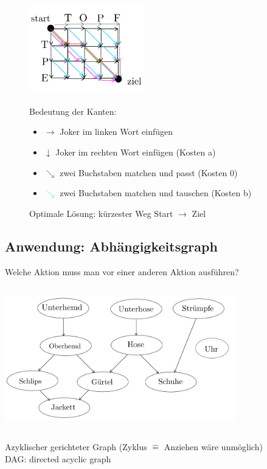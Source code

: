\documentclass[11pt, fleqn]{scrreprt}
\begin{document}
    \begin{figure}[htbp]
        \begin{minipage}{5cm}
            \vspace*{0mm}
            \includegraphics[width=5cm,height=4cm,keepaspectratio]{./Pictures/Dijkstragitter.png}
        \end{minipage}
        \begin{minipage}{10cm}
            \vspace*{0mm}
            Bedeutung der Kanten:
            \begin{itemize}
                \item $\rightarrow$ Joker im linken Wort einfügen
                \item $\downarrow$ Joker im rechten Wort einfügen (Kosten a)
                \item \textcolor{green}{$\searrow$} zwei Buchstaben matchen und passt (Kosten 0)
                \item \textcolor{cyan}{$\searrow$} zwei Buchstaben matchen und tauschen (Kosten b)
            \end{itemize}
            Optimale Lösung: kürzester Weg Start $\rightarrow$ Ziel
        \end{minipage}
    \end{figure}

    \subsection*{Anwendung: Abhängigkeitsgraph}

    Welche Aktion muss man vor einer anderen Aktion ausführen? \\

    \includegraphics[width=10cm,height=7cm,keepaspectratio]{./Pictures/Anziehen.png}\\
    Azyklischer gerichteter Graph (Zyklus $\widehat{=}$ Anziehen wäre unmöglich) \\
    DAG: directed acyclic graph\\
\end{document}
